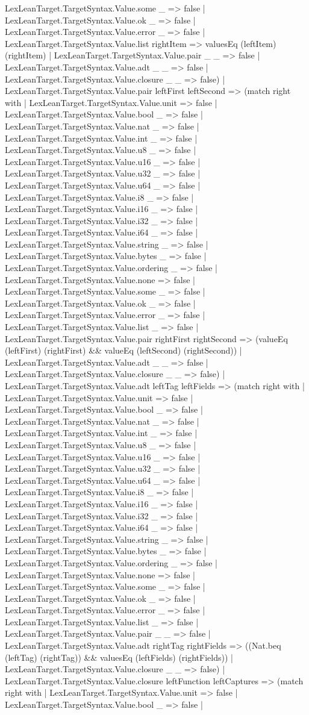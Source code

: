 \documentclass[11pt]{article}
\begin{document}
LexLeanTarget.TargetSyntax.Value.some \_ => false | LexLeanTarget.TargetSyntax.Value.ok \_ => false | LexLeanTarget.TargetSyntax.Value.error \_ => false | LexLeanTarget.TargetSyntax.Value.list rightItem => valuesEq (leftItem) (rightItem) | LexLeanTarget.TargetSyntax.Value.pair \_ \_ => false | LexLeanTarget.TargetSyntax.Value.adt \_ \_ => false | LexLeanTarget.TargetSyntax.Value.closure \_ \_ => false) | LexLeanTarget.TargetSyntax.Value.pair leftFirst leftSecond => (match right with | LexLeanTarget.TargetSyntax.Value.unit => false | LexLeanTarget.TargetSyntax.Value.bool \_ => false | LexLeanTarget.TargetSyntax.Value.nat \_ => false | LexLeanTarget.TargetSyntax.Value.int \_ => false | LexLeanTarget.TargetSyntax.Value.u8 \_ => false | LexLeanTarget.TargetSyntax.Value.u16 \_ => false | LexLeanTarget.TargetSyntax.Value.u32 \_ => false | LexLeanTarget.TargetSyntax.Value.u64 \_ => false | LexLeanTarget.TargetSyntax.Value.i8 \_ => false | LexLeanTarget.TargetSyntax.Value.i16 \_ => false | LexLeanTarget.TargetSyntax.Value.i32 \_ => false | LexLeanTarget.TargetSyntax.Value.i64 \_ => false | LexLeanTarget.TargetSyntax.Value.string \_ => false | LexLeanTarget.TargetSyntax.Value.bytes \_ => false | LexLeanTarget.TargetSyntax.Value.ordering \_ => false | LexLeanTarget.TargetSyntax.Value.none => false | LexLeanTarget.TargetSyntax.Value.some \_ => false | LexLeanTarget.TargetSyntax.Value.ok \_ => false | LexLeanTarget.TargetSyntax.Value.error \_ => false | LexLeanTarget.TargetSyntax.Value.list \_ => false | LexLeanTarget.TargetSyntax.Value.pair rightFirst rightSecond => (valueEq (leftFirst) (rightFirst) \&\& valueEq (leftSecond) (rightSecond)) | LexLeanTarget.TargetSyntax.Value.adt \_ \_ => false | LexLeanTarget.TargetSyntax.Value.closure \_ \_ => false) | LexLeanTarget.TargetSyntax.Value.adt leftTag leftFields => (match right with | LexLeanTarget.TargetSyntax.Value.unit => false | LexLeanTarget.TargetSyntax.Value.bool \_ => false | LexLeanTarget.TargetSyntax.Value.nat \_ => false | LexLeanTarget.TargetSyntax.Value.int \_ => false | LexLeanTarget.TargetSyntax.Value.u8 \_ => false | LexLeanTarget.TargetSyntax.Value.u16 \_ => false | LexLeanTarget.TargetSyntax.Value.u32 \_ => false | LexLeanTarget.TargetSyntax.Value.u64 \_ => false | LexLeanTarget.TargetSyntax.Value.i8 \_ => false | LexLeanTarget.TargetSyntax.Value.i16 \_ => false | LexLeanTarget.TargetSyntax.Value.i32 \_ => false | LexLeanTarget.TargetSyntax.Value.i64 \_ => false | LexLeanTarget.TargetSyntax.Value.string \_ => false | LexLeanTarget.TargetSyntax.Value.bytes \_ => false | LexLeanTarget.TargetSyntax.Value.ordering \_ => false | LexLeanTarget.TargetSyntax.Value.none => false | LexLeanTarget.TargetSyntax.Value.some \_ => false | LexLeanTarget.TargetSyntax.Value.ok \_ => false | LexLeanTarget.TargetSyntax.Value.error \_ => false | LexLeanTarget.TargetSyntax.Value.list \_ => false | LexLeanTarget.TargetSyntax.Value.pair \_ \_ => false | LexLeanTarget.TargetSyntax.Value.adt rightTag rightFields => ((Nat.beq (leftTag) (rightTag)) \&\& valuesEq (leftFields) (rightFields)) | LexLeanTarget.TargetSyntax.Value.closure \_ \_ => false) | LexLeanTarget.TargetSyntax.Value.closure leftFunction leftCaptures => (match right with | LexLeanTarget.TargetSyntax.Value.unit => false | LexLeanTarget.TargetSyntax.Value.bool \_ => false | 
\end{document}
